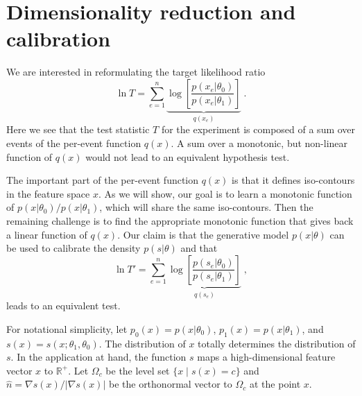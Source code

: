 \documentclass[aoas,preprint]{imsart}
\numberwithin{equation}{section}
\theoremstyle{plain}
\begin{document}



\section{Dimensionality reduction and calibration}


We are interested in reformulating the target likelihood ratio  
\begin{equation}
\ln T =   \sum_{e=1}^n \underbrace{\log \left[ \frac {p(x_e | \theta_0) }{ p(x_e | \theta_1) } \right]}_{q(x_e)} \;.
\end{equation}
Here we see that the test statistic $T$ for the experiment is composed of a sum over events of the per-event function $q(x)$. A sum over a monotonic, but non-linear function of $q(x)$ would not lead to an equivalent hypothesis test. 

The important part of the per-event function $q(x)$ is that it defines iso-contours in the feature space $x$. As we will show, our goal is to learn a monotonic function of $p(x|\theta_0)/p(x|\theta_1)$, which will share the same iso-contours. Then the remaining challenge is to find the appropriate monotonic function that gives back a linear function of $q(x)$. Our claim is that the generative model $p(x|\theta)$ can be used to calibrate the density $p(s|\theta)$ and that
\begin{equation}
\ln T' = \sum_{e=1}^n \underbrace{\log \left[ \frac {p(s_e | \theta_0) }{ p(s_e | \theta_1) } \right]}_{q(s_e)} \;,
\end{equation}
leads to an equivalent test.

For notational simplicity, let $p_0(x) = p(x|\theta_0)$, $p_1(x) = p(x|\theta_1)$, and $s(x)=s(x; \theta_1, \theta_0)$.
The distribution of $x$ totally determines the distribution of $s$. 
In the application at hand, the function $s$ maps a high-dimensional feature vector $x$ to $\mathbb{R}^+$.
Let $\Omega_{c}$ be the level set $\{x \mid s(x) = c \}$ and $\hat{n}=\nabla s(x) / |\nabla s(x)|$ be the orthonormal vector to $\Omega_c$ at the point $x$.
\end{document}
